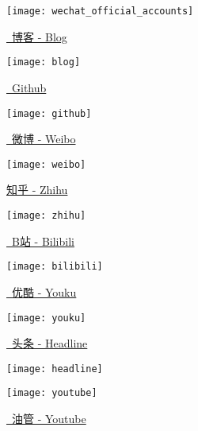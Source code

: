 \vspace*{-1.5ex}
\begin{figure}[h!]
    \begin{center}
        \texttt{[image: wechat\_official\_accounts]}
    \end{center}
    \vspace*{-6ex}

    \begin{minipage}[t]{0.22\textwidth}
        \caption*{\href{https://mister-kin.github.io}{\faBook\ 博客 - Blog}}
        \texttt{[image: blog]}
    \end{minipage}
    \quad
    \begin{minipage}[t]{0.22\textwidth}
        \caption*{\href{https://github.com/mister-kin}{\faGithub\ Github}}
        \texttt{[image: github]}
    \end{minipage}
    \quad
    \begin{minipage}[t]{0.22\textwidth}
        \caption*{\href{https://weibo.com/6270111192/profile?topnav=1&wvr=6&is_all=1}{\faWeibo\ 微博 - Weibo}}
        \texttt{[image: weibo]}
    \end{minipage}
    \quad
    \begin{minipage}[t]{0.22\textwidth}
        \caption*{\href{https://www.zhihu.com/people/drwu-94}{知乎 - Zhihu}}
        \texttt{[image: zhihu]}
    \end{minipage}

    \vspace*{1ex}

    \begin{minipage}[t]{0.22\textwidth}
        \caption*{\href{http://space.bilibili.com/17025250?}{\faTv\ B站 - Bilibili}}
        \texttt{[image: bilibili]}
    \end{minipage}
    \quad
    \begin{minipage}[t]{0.22\textwidth}
        \caption*{\href{http://i.youku.com/i/UNjA3MTk5Mjgw?spm=a2hzp.8253869.0.0}{\faChevronCircleRight\ 优酷 - Youku}}
        \texttt{[image: youku]}
    \end{minipage}
    \quad
    \begin{minipage}[t]{0.22\textwidth}
        \caption*{\href{https://www.toutiao.com/c/user/835254071079053/\#mid=1663279303982091}{\faNewspaperO\ 头条 - Headline}}
        \texttt{[image: headline]}
    \end{minipage}
    \quad
    \begin{minipage}[t]{0.22\textwidth}
        \caption*{\href{https://www.youtube.com/channel/UCXqjfWLzMlRKxGC8syWj17Q?view_as=public}{\faYoutubePlay\ 油管 - Youtube}}
        \texttt{[image: youtube]}
    \end{minipage}
\end{figure}
